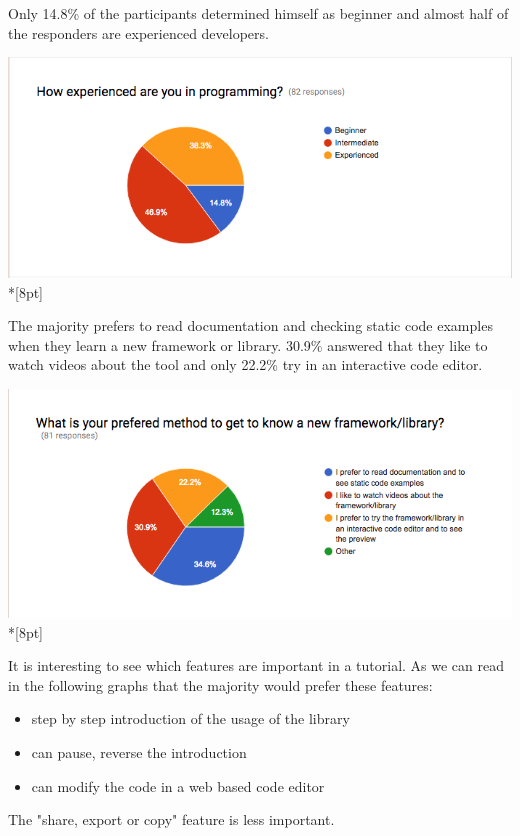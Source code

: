 \documentclass[12pt, a4paper, oneside, openright, medskipamount]{report}
\begin{document}
Only 14.8\% of the participants determined himself as beginner and almost half of the responders are experienced developers.

\includegraphics[width=1\textwidth]{assets/survey-result/how-experienced.png}\\*[8pt]

The majority prefers to read documentation and checking static code examples when they learn a new framework or library. 30.9\% answered that they like to watch videos about the tool and only 22.2\% try in an interactive code editor.

\includegraphics[width=1\textwidth]{assets/survey-result/prefered-method.png}\\*[8pt]

It is interesting to see which features are important in a tutorial. As we can read in the following graphs that the majority would prefer these features:
\begin{itemize}[noitemsep]
\item step by step introduction of the usage of the library
\item can pause, reverse the introduction
\item can modify the code in a web based code editor
\end{itemize}

The "share, export or copy" feature is less important.
\end{document}
